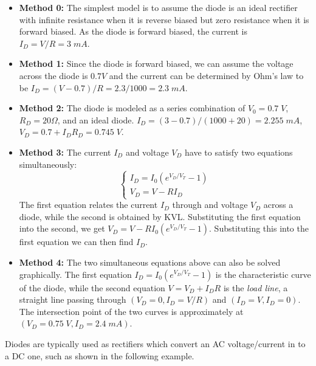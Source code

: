 \documentclass{article}
\begin{document}

\begin{itemize}

\item {\bf Method 0:} The simplest model is to assume the diode is an ideal
  rectifier with infinite resistance when it is reverse biased but zero
  resistance when it is forward biased. As the diode is forward biased,
  the current is $I_D=V/R=3\;mA$.

\item {\bf Method 1: } Since the diode is forward biased, we can assume 
  the voltage across the diode is $0.7V$ and the current can be determined 
  by Ohm's law to be $I_D=(V-0.7)/R=2.3/1000=2.3\;mA$.

\item {\bf Method 2: } The diode is modeled as a series combination of
  $V_0=0.7\;V$, $R_D=20\Omega$, and an ideal diode. $I_D=(3-0.7)/(1000+20)=2.255\;mA$,
  $V_D=0.7+I_DR_D=0.745\;V$.

\item {\bf Method 3: } The current $I_D$ and voltage $V_D$ have to satisfy 
  two equations simultaneously:
  \begin{equation}
  \left\{ \begin{array}{l} I_D=I_0(e^{V_D/V_T}-1) \\
    V_D=V-RI_D \end{array} \right. 
  \end{equation}
  The first equation relates the current $I_D$ through and voltage $V_D$ 
  across a diode, while the second is obtained by KVL. Substituting the first
  equation into the second, we get $V_D=V-RI_0(e^{V_D/V_T}-1)$. Substituting
  this into the first equation we can then find $I_D$.

\item {\bf Method 4: } The two simultaneous equations above can also be
  solved graphically. The first equation $I_D=I_0(e^{V_D/V_T}-1)$ is the
  characteristic curve of the diode, while the second equation $V=V_D+I_DR$
  is the {\em load line}, a straight line passing through $(V_D=0, I_D=V/R)$ 
  and $(I_D=V, I_D=0)$. The intersection point of the two curves is approximately
  at $(V_D=0.75\;V, I_D=2.4\;mA)$.

\end{itemize}

Diodes are typically used as rectifiers which convert an AC voltage/current
in to a DC one, such as shown in the following example.
\end{document}
